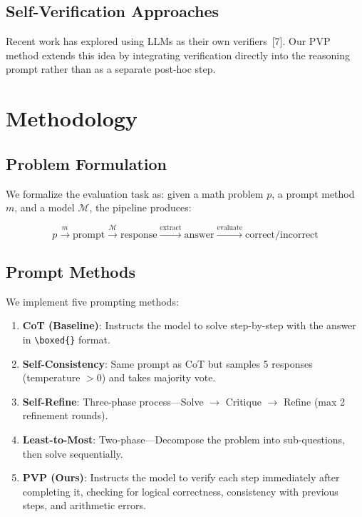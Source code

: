 \documentclass[conference]{IEEEtran}
\begin{document}
\subsection{Self-Verification Approaches}
Recent work has explored using LLMs as their own verifiers~[7]. Our PVP method extends this idea by integrating verification directly into the reasoning prompt rather than as a separate post-hoc step.

\section{Methodology}

\subsection{Problem Formulation}

We formalize the evaluation task as: given a math problem $p$, a prompt method $m$, and a model $\mathcal{M}$, the pipeline produces:

$$p \xrightarrow{m} \text{prompt} \xrightarrow{\mathcal{M}} \text{response} \xrightarrow{\text{extract}} \text{answer} \xrightarrow{\text{evaluate}} \text{correct/incorrect}$$

\subsection{Prompt Methods}

We implement five prompting methods:
\begin{enumerate}
    \item \textbf{CoT (Baseline)}: Instructs the model to solve step-by-step with the answer in \texttt{\textbackslash boxed\{\}} format.
    \item \textbf{Self-Consistency}: Same prompt as CoT but samples 5 responses (temperature $>0$) and takes majority vote.
    \item \textbf{Self-Refine}: Three-phase process---Solve $\rightarrow$ Critique $\rightarrow$ Refine (max 2 refinement rounds).
    \item \textbf{Least-to-Most}: Two-phase---Decompose the problem into sub-questions, then solve sequentially.
    \item \textbf{PVP (Ours)}: Instructs the model to verify each step immediately after completing it, checking for logical correctness, consistency with previous steps, and arithmetic errors.
\end{enumerate}
\end{document}
